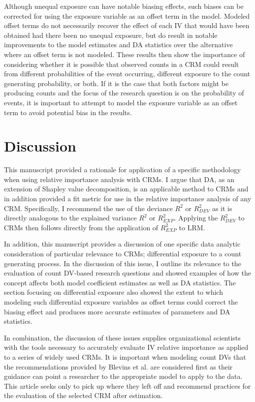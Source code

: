 \documentclass[ShortAfour,times,sageapa]{sagej}
\begin{document}
	Although unequal exposure can have notable biasing effects, such biases can be corrected for using the exposure variable as an offset term in the model.
	Modeled offset terms do not necessarily recover the effect of each IV that would have been obtained had there been no unequal exposure, but do result in notable improvements to the model estimates and DA statistics over the alternative where an offset term is not modeled. 
	These results then show the importance of considering whether it is possible that observed counts in a CRM could result from different probabilities of the event occurring, different exposure to the count generating probability, or both.
	If it is the case that both factors might be producing counts and the focus of the research question is on the probability of events, it is important to attempt to model the exposure variable as an offset term to avoid potential bias in the results.

	
\section{Discussion}

	This manuscript provided a rationale for application of a specific methodology when using relative importance analysis with CRMs.
	I argue that DA, as an extension of Shapley value decomposition, is an applicable method to CRMs and in addition provided a fit metric for use in the relative importance analysis of any CRM.
	Specifically, I recommend the use of the deviance $R^2$ or $R^2_{DEV}$ as it is directly analogous to the explained variance $R^2$ or $R^2_{EXP}$.
	Applying the $R^2_{DEV}$ to CRMs then follows directly from the application of $R^2_{EXP}$ to LRM.
	
	In addition, this manuscript provides a discussion of one specific data analytic consideration of particular relevance to CRMs; differential exposure to a count generating process.
	In the discussion of this issue, I outline its relevance to the evaluation of count DV-based research questions and showed examples of how the concept affects both model coefficient estimates as well as DA statistics.
	The section focusing on differential exposure also showed the extent to which modeling such differential exposure variables as offset terms could correct the biasing effect and produces more accurate estimates of parameters and DA statistics.
	
	In combination, the discussion of these issues supplies organizational scientists with the tools necessary to accurately evaluate IV relative importance as applied to a series of widely used CRMs. 
	It is important when modeling count DVs that the recommendations provided by Blevins et al. \cite{blevins2015count} are considered first as their guidance can point a researcher to the appropriate model to apply to the data. 
	This article seeks only to pick up where they left off and recommend practices for the evaluation of the selected CRM after estimation. 
	
\end{document}
